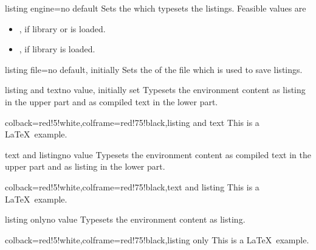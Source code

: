 \begin{docTcbKey}{listing engine}{=}{no default}
  Sets the  which typesets the listings. Feasible values are
  \begin{itemize}
  \item{}, if library  or
   is loaded.
  \item{}, if library  is loaded.
  \end{itemize}
\end{docTcbKey}

\begin{docTcbKey}{listing file}{=}{no default, initially }
  Sets the  of the file which is used to save listings.
\end{docTcbKey}


\begin{docTcbKey}{listing and text}{}{no value, initially set}
  Typesets the environment content as listing in the upper part and
  as compiled text in the lower part.
\begin{dispExample}
\begin{tcblisting}{colback=red!5!white,colframe=red!75!black,listing and text}
This is a \LaTeX\ example.
\end{tcblisting}
\end{dispExample}
\end{docTcbKey}


\begin{docTcbKey}{text and listing}{}{no value}
  Typesets the environment content as compiled text in the upper part and
  as listing in the lower part.
\begin{dispExample}
\begin{tcblisting}{colback=red!5!white,colframe=red!75!black,text and listing}
This is a \LaTeX\ example.
\end{tcblisting}
\end{dispExample}
\end{docTcbKey}


\begin{docTcbKey}{listing only}{}{no value}
  Typesets the environment content as listing.
\begin{dispExample}
\begin{tcblisting}{colback=red!5!white,colframe=red!75!black,listing only}
This is a \LaTeX\ example.
\end{tcblisting}
\end{dispExample}
\end{docTcbKey}


